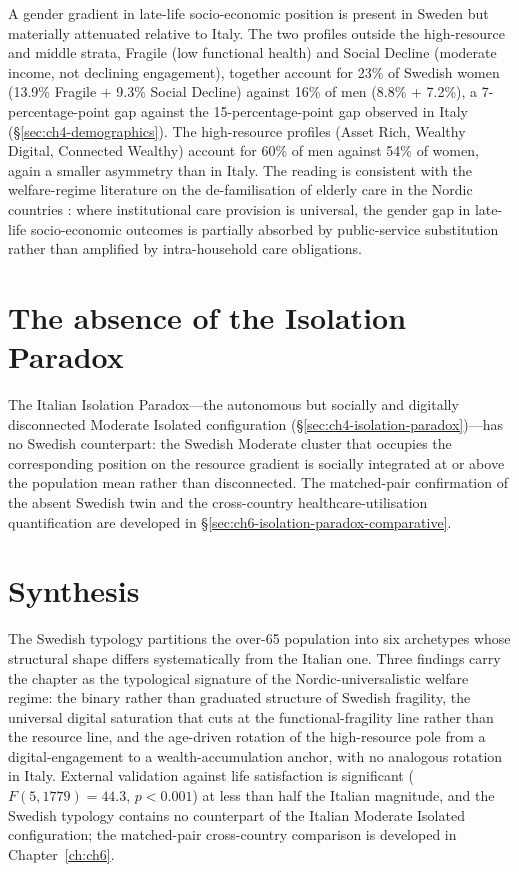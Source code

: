 A gender gradient in late-life socio-economic position is present in Sweden but materially attenuated relative to Italy. The two profiles outside the high-resource and middle strata, Fragile (low functional health) and Social Decline (moderate income, not declining engagement), together account for 23\% of Swedish women (13.9\% Fragile + 9.3\% Social Decline) against 16\% of men (8.8\% + 7.2\%), a 7-percentage-point gap against the 15-percentage-point gap observed in Italy (\S\ref{sec:ch4-demographics}). The high-resource profiles (Asset Rich, Wealthy Digital, Connected Wealthy) account for 60\% of men against 54\% of women, again a smaller asymmetry than in Italy. The reading is consistent with the welfare-regime literature on the de-familisation of elderly care in the Nordic countries \citep{anttonen1996}: where institutional care provision is universal, the gender gap in late-life socio-economic outcomes is partially absorbed by public-service substitution rather than amplified by intra-household care obligations.

\section{The absence of the Isolation Paradox}
\label{sec:ch5-no-paradox}

The Italian Isolation Paradox---the autonomous but socially and digitally disconnected Moderate Isolated configuration (\S\ref{sec:ch4-isolation-paradox})---has no Swedish counterpart: the Swedish Moderate cluster that occupies the corresponding position on the resource gradient is socially integrated at or above the population mean rather than disconnected. The matched-pair confirmation of the absent Swedish twin and the cross-country healthcare-utilisation quantification are developed in \S\ref{sec:ch6-isolation-paradox-comparative}.

\section{Synthesis}
\label{sec:ch5-synthesis}

The Swedish typology partitions the over-65 population into six archetypes whose structural shape differs systematically from the Italian one. Three findings carry the chapter as the typological signature of the Nordic-universalistic welfare regime: the binary rather than graduated structure of Swedish fragility, the universal digital saturation that cuts at the functional-fragility line rather than the resource line, and the age-driven rotation of the high-resource pole from a digital-engagement to a wealth-accumulation anchor, with no analogous rotation in Italy. External validation against life satisfaction is significant ($F(5, 1779) = 44.3$, $p < 0.001$) at less than half the Italian magnitude, and the Swedish typology contains no counterpart of the Italian Moderate Isolated configuration; the matched-pair cross-country comparison is developed in Chapter~\ref{ch:ch6}.
